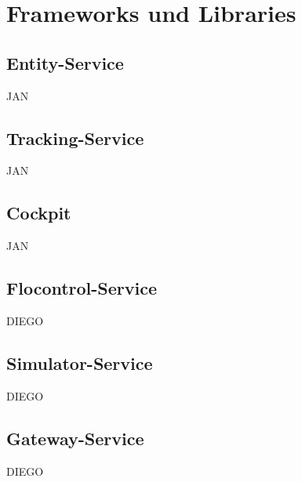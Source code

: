 \section{Frameworks und Libraries}

\subsection{Entity-Service}
JAN

\subsection{Tracking-Service}
JAN

\subsection{Cockpit}
JAN

\subsection{Flocontrol-Service}
DIEGO

\subsection{Simulator-Service}
DIEGO

\subsection{Gateway-Service}
DIEGO
